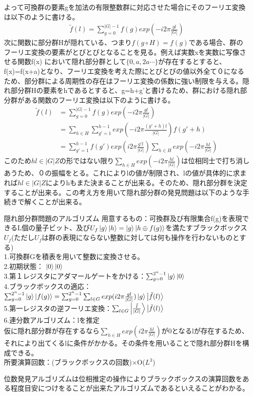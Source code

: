 \documentclass[a4paper,10.5pt]{article}
\numberwithin{equation}{section}
\begin{document}
よって可換群の要素gを加法の有限整数群に対応させた場合にそのフーリエ変換は以下のように書ける。
\begin{equation}\begin{split}
    \tilde{f}(l) = \sum_{g=0}^{|G|-1} f(g) exp(-i2 \pi \frac{gl}{|G|})
\end{split} \end{equation}
次に関数に部分群Hが隠れている、つまり$f(g \circ H) = f(g)$である場合、群のフーリエ変換の要素がとびとびとなることを見る。例えば実数xを実数に写像させる関数f(x) において隠れ部分群として$\{0,a,2a \cdots \}$が存在するとすると、f(x)=f(x+a)となり、フーリエ変換を考えた際にとびとびの値以外全て０になるため、部分群による周期性の存在はフーリエ変換の係数に強い制限を与える。隠れ部分群Hの要素をhであるとすると、g=h+g'と書けるため、群における隠れ部分群がある関数のフーリエ変換は以下のように書ける。
\begin{equation}\begin{split}
    \tilde{f}(l)
    &=\sum_{g=0}^{|G|-1} f(g) exp(-i2 \pi \frac{gl}{|G|})\\
    &=\sum_{h \in H} \sum_{g'=1}^{h-1} exp(-i2 \pi \frac{(g'+h)l}{|G|})f(g'+h)\\
    &=\sum_{g'=1}^{h-1} f(g') exp(i2 \pi \frac{g'l}{|G|})\sum_{h \in H} exp(-i2 \pi \frac{hl}{|G|})
\end{split} \end{equation}
このため$hl \in |G|Z$の形ではない限り$\sum_{h \in H} exp(-i2 \pi \frac{hl}{|G|})$は位相同士で打ち消しあうため、０の振幅をとる。これによりlの値が制限され、lの値が具体的に求まれば$hl \in |G|Z$によりhもまた決まることが出来る。そのため、隠れ部分群を決定することが出来る。この考え方を用いて隠れ部分群の発見問題は以下のような手続きで解くことが出来る。
\begin{itembox}[l]{隠れ部分群問題のアルゴリズム}
用意するもの：可換群及び有限集合f(g)を表現できるL個の量子ビット、及び$U_{f}\ket{g}\ket{h}=\ket{g}\ket{h \oplus f(g)}$を満たすブラックボックス$U_{f}$(ただし$U_{f}$は群の表現にならない整数に対しては何も操作を行わないものとする) \\
1.可換群Gを積表を用いて整数に変換させる。\\
2.初期状態： $\ket{0}\ket{0}$\\
3.第１レジスタにアダマールゲートをかける：$\sum_{g=0}^{2^{n}-1}\ket{g}\ket{0}$\\
4.ブラックボックスの適応：$\sum_{g=0}^{2^{n}-1}\ket{g}\ket{f(g)}=\sum_{g=0}^{2^{n}-1}
\sum_{l \in G}exp(i2\pi \frac{gl}{|G|})\ket{g}\ket{\tilde{f}(l)}$\\
5.第一レジスタの逆フーリエ変換：$\sum_{l \in G} \ket{\frac{\tilde{l}}{|G|}}\ket{\tilde{f}(l)}$\\
6.連分数アルゴリズム：lを推定\\
仮に隠れ部分群が存在するなら$\sum_{h \in H} exp(i2 \pi \frac{hl}{|G|})$が0となるlが存在するため、それにより出てくるlに条件がかかる。その条件を用いることで隠れ部分群Hを構成できる。\\
所要演算回数：(ブラックボックスの回数)×O($L^{3}$)\\
\end{itembox}
位数発見アルゴリズムは位相推定の操作によりブラックボックスの演算回数をある程度目安につけをることが出来たアルゴリズムであるといえることがわかる。
\end{document}
